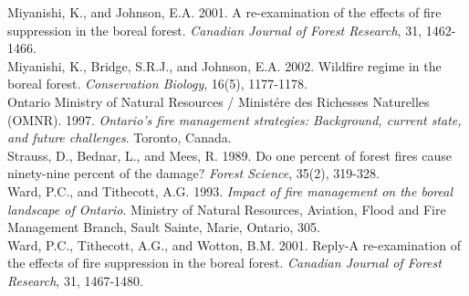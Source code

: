 \documentclass{article}
\begin{document}
\noindent Miyanishi, K., and Johnson, E.A. 2001. A re-examination of the effects of fire suppression in the boreal forest. {\it Canadian Journal of Forest Research}, 31, 1462-1466.\\

\noindent Miyanishi, K., Bridge, S.R.J., and Johnson, E.A. 2002. Wildfire regime in the boreal forest. {\it Conservation Biology}, 16(5), 1177-1178.\\

\noindent Ontario Ministry of Natural Resources / Minist\'{e}re des Richesses Naturelles (OMNR). 1997. {\it Ontario's fire management strategies: Background, current state, and future challenges}. Toronto, Canada.\\

\noindent Strauss, D., Bednar, L., and Mees, R. 1989. Do one percent of forest fires cause ninety-nine percent of the damage? {\it Forest Science}, 35(2), 319-328.\\

\noindent Ward, P.C., and Tithecott, A.G. 1993. {\it Impact of fire management on the boreal landscape of Ontario}. Ministry of Natural Resources, Aviation, Flood and Fire Management Branch, Sault Sainte, Marie, Ontario, 305.\\

\noindent Ward, P.C., Tithecott, A.G., and Wotton, B.M. 2001. Reply-A re-examination of the effects of fire suppression in the boreal forest. {\it Canadian Journal of Forest Research}, 31, 1467-1480.\\ 
\end{document}

